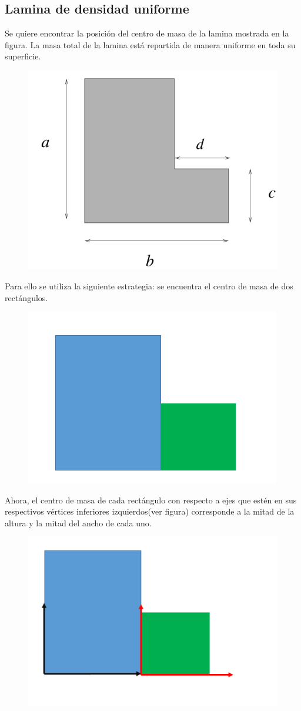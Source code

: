 \documentclass[a4paper,11pt]{article}
\theoremstyle{mytheor}
\begin{document}
\subsection{Lamina de densidad uniforme} 

Se quiere encontrar la posición del centro de masa de la lamina mostrada en la figura. La masa total
de la lamina está repartida de manera uniforme en toda su superficie. 
\begin{figure}[h]
	\includegraphics[width=0.7\linewidth]{4}
	\label{fcN4}
\end{figure}


Para ello se utiliza la siguiente estrategia: se encuentra el centro de masa de dos rectángulos.

\begin{figure}[h]
	\includegraphics[width=0.7\linewidth]{recdiv}
	\label{fcN4}
\end{figure}

Ahora, el centro de masa de cada rectángulo con respecto a ejes que estén en sus respectivos vértices inferiores izquierdos(ver figura) corresponde a la mitad de la altura y la mitad del ancho de cada uno.

\begin{figure}[h]
	\includegraphics[width=0.7\linewidth]{vert}
	\label{fcN4}
\end{figure}
\end{document}
